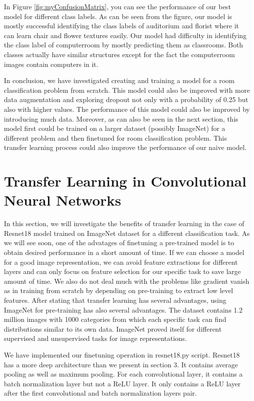 \documentclass{article}
\begin{document}
In Figure \ref{fig:myConfusionMatrix}, you can see the performance of our best model for different class labels. As can be seen from the figure, our model is mostly successful identifying the class labels of auditorium and florist where it can learn chair and flower textures easily. Our model had difficulty in identifying the class label of computerroom by mostly predicting them as classrooms. Both classes actually have similar structures except for the fact the computerroom images contain computers in it.

In conclusion, we have investigated creating and training a model for a room classification problem from scratch. This model could also be improved with more data augmentation and exploring dropout not only with a probability of 0.25 but also with higher values. The performance of this model could also be improved by introducing much data. Moreover, as can also be seen in the next section, this model first could be trained on a larger dataset (possibly ImageNet) for a different problem and then finetuned for room classification problem. This transfer learning process could also improve the performance of our naive model.

\section{Transfer Learning in Convolutional Neural Networks}

In this section, we will investigate the benefits of transfer learning in the case of Resnet18 model trained on ImageNet dataset for a different classification task. As we will see soon, one of the advatages of finetuning a pre-trained model is to obtain desired performance in a short amount of time. If we can choose a model for a good image representation, we can avoid feature extractions for different layers and can only focus on feature selection for our specific task to save large amount of time. We also do not deal much with the problems like gradient vanish as in training from scratch by depending on pre-training to extract low level features. After stating that transfer learning has several advantages, using ImageNet for pre-training has also several advantages. The dataset contains 1.2 million images with 1000 categories from which each specific task can find distributions similar to its own data. ImageNet proved itself for different supervised and unsupervised tasks for image representations.

We have implemented our finetuning operation in resnet18.py script. Resnet18 has a more deep architecture than we present in section 3. It contains average pooling as well as maximum pooling. For each convolutional layer, it contains a batch normalization layer but not a ReLU layer. It only contains a ReLU layer after the first convolutional and batch normalization layers pair.
\end{document}
